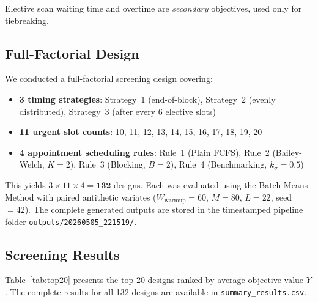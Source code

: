 \documentclass[12pt, a4paper]{article}
\begin{document}
Elective scan waiting time and overtime are \textit{secondary} objectives, used only for tiebreaking.

\subsection{Full-Factorial Design}

We conducted a full-factorial screening design covering:
\begin{itemize}
    \item \textbf{3 timing strategies}: Strategy~1 (end-of-block), Strategy~2 (evenly distributed), Strategy~3 (after every 6 elective slots)
    \item \textbf{11 urgent slot counts}: 10, 11, 12, 13, 14, 15, 16, 17, 18, 19, 20
    \item \textbf{4 appointment scheduling rules}: Rule~1 (Plain FCFS), Rule~2 (Bailey-Welch, $K=2$), Rule~3 (Blocking, $B=2$), Rule~4 (Benchmarking, $k_\sigma=0.5$)
\end{itemize}

This yields $3 \times 11 \times 4 = \mathbf{132}$ designs. Each was evaluated using the Batch Means Method with paired antithetic variates ($W_{\text{warmup}}=60$, $M=80$, $L=22$, seed~$=42$). The complete generated outputs are stored in the timestamped pipeline folder \texttt{outputs/20260505\_221519/}.

\subsection{Screening Results}

Table~\ref{tab:top20} presents the top 20 designs ranked by average objective value $\bar{Y}$. The complete results for all 132 designs are available in \texttt{summary\_results.csv}.
\end{document}
